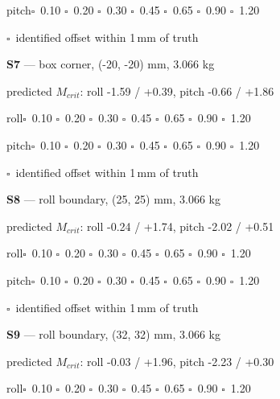 \documentclass[10pt]{article}
\begin{document}
\hspace*{6mm}pitch\quad $\square$~0.10 \quad $\square$~0.20 \quad $\square$~0.30 \quad $\square$~0.45 \quad $\square$~0.65 \quad $\square$~0.90 \quad $\square$~1.20\par
\hspace*{6mm}$\square$~identified offset within 1\,mm of truth\par\medskip
\textbf{S7} --- box corner, (-20, -20) mm, 3.066 kg\par
\hspace*{6mm}\footnotesize predicted $M_{crit}$: roll -1.59 / +0.39, pitch -0.66 / +1.86\normalsize\par
\hspace*{6mm}roll\quad $\square$~0.10 \quad $\square$~0.20 \quad $\square$~0.30 \quad $\square$~0.45 \quad $\square$~0.65 \quad $\square$~0.90 \quad $\square$~1.20\par
\hspace*{6mm}pitch\quad $\square$~0.10 \quad $\square$~0.20 \quad $\square$~0.30 \quad $\square$~0.45 \quad $\square$~0.65 \quad $\square$~0.90 \quad $\square$~1.20\par
\hspace*{6mm}$\square$~identified offset within 1\,mm of truth\par\medskip
\textbf{S8} --- roll boundary, (25, 25) mm, 3.066 kg\par
\hspace*{6mm}\footnotesize predicted $M_{crit}$: roll -0.24 / +1.74, pitch -2.02 / +0.51\normalsize\par
\hspace*{6mm}roll\quad $\square$~0.10 \quad $\square$~0.20 \quad $\square$~0.30 \quad $\square$~0.45 \quad $\square$~0.65 \quad $\square$~0.90 \quad $\square$~1.20\par
\hspace*{6mm}pitch\quad $\square$~0.10 \quad $\square$~0.20 \quad $\square$~0.30 \quad $\square$~0.45 \quad $\square$~0.65 \quad $\square$~0.90 \quad $\square$~1.20\par
\hspace*{6mm}$\square$~identified offset within 1\,mm of truth\par\medskip
\textbf{S9} --- roll boundary, (32, 32) mm, 3.066 kg\par
\hspace*{6mm}\footnotesize predicted $M_{crit}$: roll -0.03 / +1.96, pitch -2.23 / +0.30\normalsize\par
\hspace*{6mm}roll\quad $\square$~0.10 \quad $\square$~0.20 \quad $\square$~0.30 \quad $\square$~0.45 \quad $\square$~0.65 \quad $\square$~0.90 \quad $\square$~1.20\par
\end{document}
